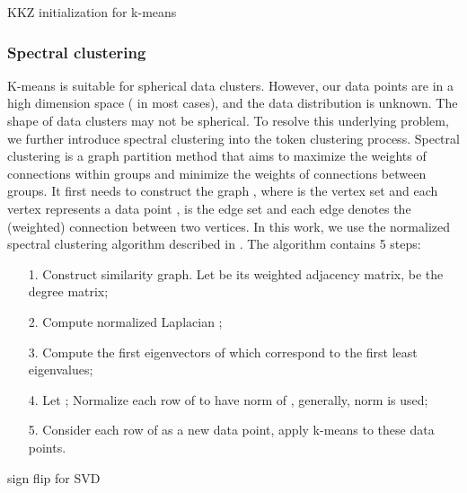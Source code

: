 \documentclass[sigconf]{acmart}
\begin{document}
\begin{algorithm}[t]
	\caption{KKZ initialization for k-means~\cite{1994_KKZ}}
	\label{algo-kkz}
 	\;
 	
 	\For{ \KwTo }
	{
		\For{ \KwTo }
		{
			\For{ \KwTo }
			{	
			\;
			}
			\;
		}
		\;
	}
\end{algorithm}

\subsubsection{\textbf{Spectral clustering}}
K-means is suitable for spherical data clusters.
However, our data points are
in a high dimension space  ( in most cases), and
the data distribution is unknown.
The shape of data clusters may not be spherical.
To resolve this underlying problem,
we further introduce spectral clustering into the token clustering process.
Spectral clustering is a graph partition method that aims to maximize the
weights of connections within groups and minimize the weights of connections
between groups.
It first needs to construct the graph ,
where  is the vertex set and each vertex
represents a data point ,  is the edge set and
each edge denotes the (weighted) connection between two vertices.
In this work, we use the normalized spectral clustering algorithm described in \cite{Ng01onspectral}.
The algorithm contains 5 steps:
\begin{itemize}
	\item[1.] Construct similarity graph. Let  be its weighted adjacency matrix,  be the degree matrix;
	\item[2.] Compute normalized Laplacian ;
	\item[3.] Compute the first  eigenvectors  of 
	which correspond to the first  least eigenvalues;
	\item[4.] Let ; Normalize each row of  to have norm of , generally,  norm is used;
	\item[5.] Consider each row of  as a new data point, apply k-means to these data points.
\end{itemize}
\begin{algorithm}[t]
	\caption{sign flip for SVD~\cite{signflip1}}
	\label{algo-sign}
	\For{ \KwTo }
	{
		\;
		\;
	}
	\For{ \KwTo }
	{
		\;
	}
\end{algorithm}
\end{document}
